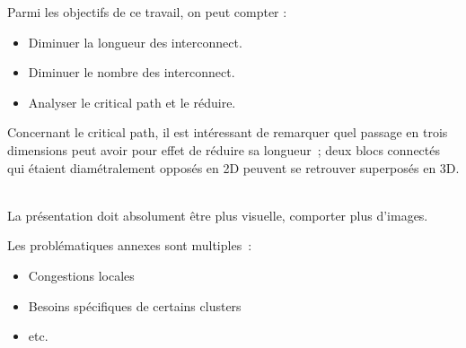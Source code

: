 \documentclass[12pt,a4paper]{article}
\begin{document}
Parmi les objectifs de ce travail, on peut compter :
\begin{itemize}
  \item Diminuer la longueur des interconnect.
  \item Diminuer le nombre des interconnect.
  \item Analyser le critical path et le réduire.
\end{itemize}
Concernant le critical path, il est intéressant de remarquer quel passage en trois dimensions peut avoir pour effet de réduire sa longueur~; deux blocs connectés qui étaient diamétralement opposés en 2D peuvent se retrouver superposés en 3D.
~\newline{}

La présentation doit absolument être plus visuelle, comporter plus d'images.
~\newline{}

Les problématiques annexes sont multiples~:
\begin{itemize}
  \item Congestions locales
  \item Besoins spécifiques de certains clusters
  \item etc.
\end{itemize}
\end{document}
